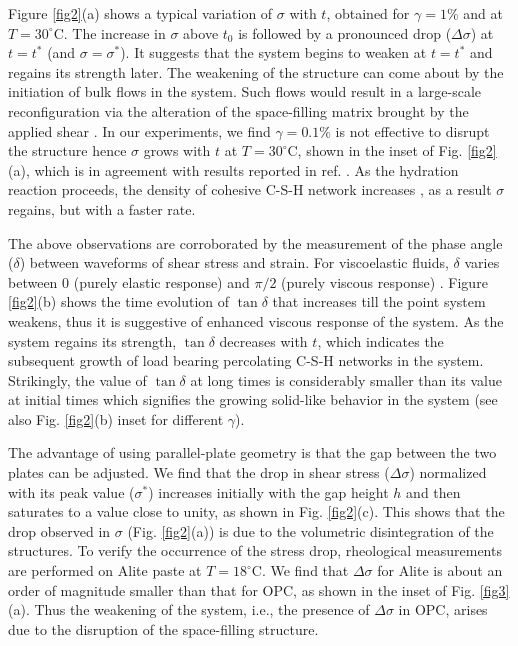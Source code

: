 \documentclass[final,5p,twocolumn]{elsarticle}
\begin{document}
{	

Figure \ref{fig2}(a) shows a typical variation of $\sigma$ with $t$, obtained for $\gamma=1\%$ and at $T=30 ^{\circ}\mbox{C}$. The increase in $\sigma$ above $t_0$ is  followed by a pronounced drop ($\Delta\sigma$) at $t =t^{\ast}$ (and $\sigma=\sigma^{\ast}$).  It suggests that the system begins to weaken at $t=t^{\ast}$ and  regains its strength later. The weakening of the structure can come about by the  initiation of  bulk flows in the system. Such flows  would result in a large-scale reconfiguration  via the  alteration of  the  space-filling matrix brought by the applied shear  \cite{roussel_steady_2005}.  In our experiments, we find $\gamma=0.1\%$ is not effective  to disrupt the structure hence $\sigma$ grows with $t$ at $T=30 ^{\circ}\mbox{C}$, shown in the inset of Fig. \ref{fig2}(a), which is in agreement with results reported in ref. \cite{bellotto_2013, nachbaur_dynamic_2001}.  As the hydration reaction proceeds, the density of cohesive C-S-H network increases \cite{gallucci_2013}, as a result $\sigma$ regains, but with a faster rate. 

The above observations are corroborated by the measurement of the phase angle ($\delta$) between waveforms of shear stress and strain. For viscoelastic fluids, $\delta$ varies between 0  (purely elastic response) and  $\pi/2$ (purely viscous response) \cite{larson_structure_1999}.  Figure \ref{fig2}(b) shows the time evolution of $\tan\delta$ that increases till the point system weakens, thus it is suggestive of enhanced viscous response of the system. As the system regains its strength, $\tan\delta$ decreases with $t$, which indicates the subsequent growth of load bearing percolating C-S-H networks in the system. Strikingly, the value of $\tan\delta$ at long times is considerably smaller than its value at initial times which signifies the growing solid-like behavior in the system (see also Fig. \ref{fig2}(b) inset for different $\gamma$). 



The advantage of using parallel-plate geometry is that the gap between the two plates can be adjusted. We find that the drop in shear stress ($\Delta\sigma$) normalized with  its peak value ($\sigma^{\ast}$) increases initially with the gap height $h$ and then saturates to a value close to unity, as shown in Fig. \ref{fig2}(c). This shows that the drop observed in $\sigma$ (Fig. \ref{fig2}(a)) is due to the volumetric disintegration of the structures.   To verify the occurrence of the stress drop, rheological measurements are performed on Alite paste at $T=18 ^{\circ}\mbox{C}$. We find that $\Delta\sigma$ for Alite is about an order of magnitude smaller than that for OPC, as shown in the inset of Fig. \ref{fig3}(a). Thus  
the weakening of the system, i.e., the presence of $\Delta\sigma$ in OPC, arises due to the disruption of the  space-filling structure.  


}
\end{document}
